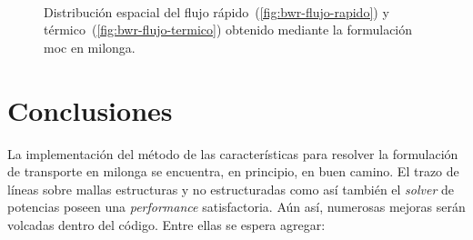 \documentclass[11pt]{article}
\numberwithin{equation}{section}
\begin{document}
\begin{figure}[!ht]
 \begin{center}
  \\
  \caption{Distribución espacial del flujo rápido~(\ref{fig:bwr-flujo-rapido}) y térmico~(\ref{fig:bwr-flujo-termico}) obtenido mediante la formulación moc en milonga.}
  \label{fig:bwr-flujos}
 \end{center}
\end{figure}


\section{Conclusiones}

La implementación del método de las características para resolver la formulación de transporte en milonga se encuentra, en principio, en buen camino. El trazo de líneas sobre mallas estructuras y no estructuradas como así también el \emph{solver} de potencias poseen una \emph{performance} satisfactoria. Aún así, numerosas mejoras serán volcadas dentro del código. Entre ellas se espera agregar:
\end{document}
